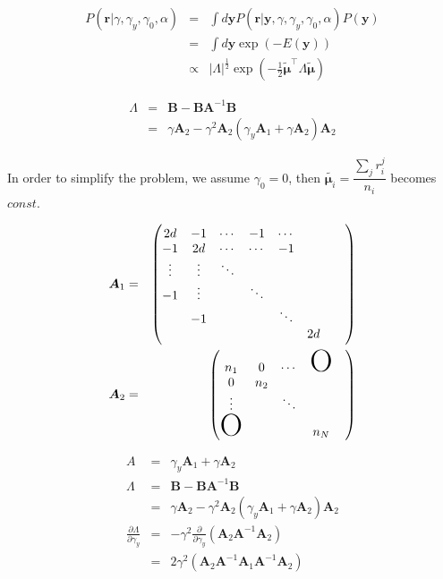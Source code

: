 \documentclass[platex, a4paper]{jsarticle}
\begin{document}
\begin{eqnarray}
  P( \bm{r} | \gamma, \gamma_y, \gamma_0, \alpha) &=& \int d\bm{y}  P( \bm{r} | \bm{y} , \gamma, \gamma_y, \gamma_0, \alpha) P(\bm{y} ) \\
  &=&  \int d\bm{y}  \exp\left(- E(\bm{y} ) \right) \\
  &\propto& |\Lambda|^{\frac{1}{2}}  \exp\left( - \frac{1}{2} \tilde{\bm{\mu}}^\top \Lambda \tilde{\bm{\mu}}\right)
\end{eqnarray}

\begin{eqnarray}
  \Lambda &=& \bm{B} - \bm{B} \bm{A}^{-1} \bm{B}\\
           &=& \gamma \bm{A}_2 - \gamma^2 \bm{A}_2 (\gamma_y \bm{A}_1 + \gamma \bm{A}_2) \bm{A}_2
\end{eqnarray}

In order to simplify the problem,
we assume $\gamma_0=0$, then $\tilde{\bm{\mu}_i} = \dfrac {\sum _{j}r_{i}^{j}} {n_{i}}$ becomes $const$.

\begin{eqnarray}
  \bm{A}_1 &=&
    \begin{pmatrix}
      2d & -1 & \cdots & -1 & \cdots &\\
      -1 & 2d &\cdots &  \cdots &  -1  &  \\
      \vdots&\vdots& \ddots &&& \\
      -1 &\vdots&& \ddots &&& \\
      & -1 &&& \ddots &&& \\
      &&&&& 2d \\
    \end{pmatrix} \\
  \bm{A}_2  &=&
    \begin{pmatrix}
      n_1 & 0 & \cdots & \mbox{\Huge O}\\
      0 & n_2 & && \\
      \vdots & & \ddots \\
      \mbox{\Huge O}&&& n_N
    \end{pmatrix}
\end{eqnarray}

\begin{eqnarray}
  A &=& \gamma_y \bm{A}_1 + \gamma \bm{A}_2 \\
  \Lambda &=& \bm{B} - \bm{B} \bm{A}^{-1} \bm{B}\\
           &=& \gamma \bm{A}_2 - \gamma^2 \bm{A}_2 (\gamma_y \bm{A}_1 + \gamma \bm{A}_2) \bm{A}_2 \\
  \frac{\partial \Lambda}{\partial \gamma_y} &=& - \gamma^2 \frac{\partial}{\partial \gamma_y}
    \left(\bm{A}_2 \bm{A}^{-1} \bm{A}_2  \right) \\
    &=& 2 \gamma^2  \left(\bm{A}_2 \bm{A}^{-1} \bm{A}_1 \bm{A}^{-1} \bm{A}_2  \right)
\end{eqnarray}
\end{document}
